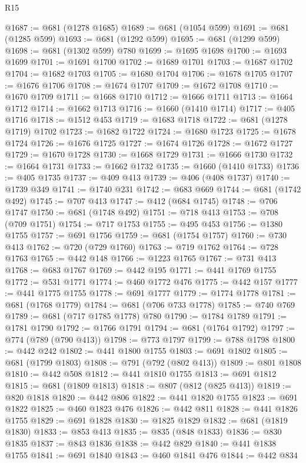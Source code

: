 \begin{lexlean}{R15}
\begin{coremodule}
@1687 := @681 (@1278 @1685)
@1689 := @681 (@1054 @599)
@1691 := @681 (@1285 @599)
@1693 := @681 (@1292 @599)
@1695 := @681 (@1299 @599)
@1698 := @681 (@1302 @599) @780
@1699 := @1695 @1698
@1700 := @1693 @1699
@1701 := @1691 @1700
@1702 := @1689 @1701
@1703 := @1687 @1702
@1704 := @1682 @1703
@1705 := @1680 @1704
@1706 := @1678 @1705
@1707 := @1676 @1706
@1708 := @1674 @1707
@1709 := @1672 @1708
@1710 := @1670 @1709
@1711 := @1668 @1710
@1712 := @1666 @1711
@1713 := @1664 @1712
@1714 := @1662 @1713
@1716 := @1660 (@1410 @1714)
@1717 := @405 @1716
@1718 := @1512 @453
@1719 := @1683 @1718
@1722 := @681 (@1278 @1719) @1702
@1723 := @1682 @1722
@1724 := @1680 @1723
@1725 := @1678 @1724
@1726 := @1676 @1725
@1727 := @1674 @1726
@1728 := @1672 @1727
@1729 := @1670 @1728
@1730 := @1668 @1729
@1731 := @1666 @1730
@1732 := @1664 @1731
@1733 := @1662 @1732
@1735 := @1660 (@1410 @1733)
@1736 := @405 @1735
@1737 := @409 @413
@1739 := @406 (@408 @1737)
@1740 := @1739 @349
@1741 := @1740 @231
@1742 := @683 @669
@1744 := @681 (@1742 @492)
@1745 := @707 @413
@1747 := @412 (@684 @1745)
@1748 := @706 @1747
@1750 := @681 (@1748 @492)
@1751 := @718 @413
@1753 := @708 (@709 @1751)
@1754 := @717 @1753
@1755 := @495 @453
@1756 := @1380 @1755
@1757 := @691 @1756
@1759 := @681 (@1754 @1757)
@1760 := @730 @413
@1762 := @720 (@729 @1760)
@1763 := @719 @1762
@1764 := @728 @1763
@1765 := @442 @148
@1766 := @1223 @1765
@1767 := @731 @413
@1768 := @683 @1767
@1769 := @442 @195
@1771 := @441 @1769 @1755
@1772 := @531 @1771
@1774 := @460 @1772 @476
@1775 := @442 @157
@1777 := @441 @1775 @1755
@1778 := @691 @1777
@1779 := @1774 @1778
@1781 := @681 (@1768 @1779)
@1784 := @681 (@706 @733 @1778)
@1785 := @740 @769
@1789 := @681 (@717 @1785 @1778) @780
@1790 := @1784 @1789
@1791 := @1781 @1790
@1792 := @1766 @1791
@1794 := @681 (@1764 @1792)
@1797 := @774 (@789 (@790 @413))
@1798 := @773 @1797
@1799 := @788 @1798
@1800 := @442 @242
@1802 := @441 @1800 @1755
@1803 := @691 @1802
@1805 := @681 (@1799 @1803)
@1808 := @791 (@792 (@802 @413))
@1809 := @801 @1808
@1810 := @442 @508
@1812 := @441 @1810 @1755
@1813 := @691 @1812
@1815 := @681 (@1809 @1813)
@1818 := @807 (@812 (@825 @413))
@1819 := @820 @1818
@1820 := @442 @806
@1822 := @441 @1820 @1755
@1823 := @691 @1822
@1825 := @460 @1823 @476
@1826 := @442 @811
@1828 := @441 @1826 @1755
@1829 := @691 @1828
@1830 := @1825 @1829
@1832 := @681 (@1819 @1830)
@1833 := @853 @413
@1835 := @835 (@848 @1833)
@1836 := @830 @1835
@1837 := @843 @1836
@1838 := @442 @829
@1840 := @441 @1838 @1755
@1841 := @691 @1840
@1843 := @460 @1841 @476
@1844 := @442 @834

\end{coremodule}
\end{lexlean}
